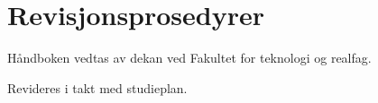 \chapter{Revisjonsprosedyrer}

Håndboken vedtas av dekan ved Fakultet for teknologi og realfag.

Revideres i takt med studieplan.
